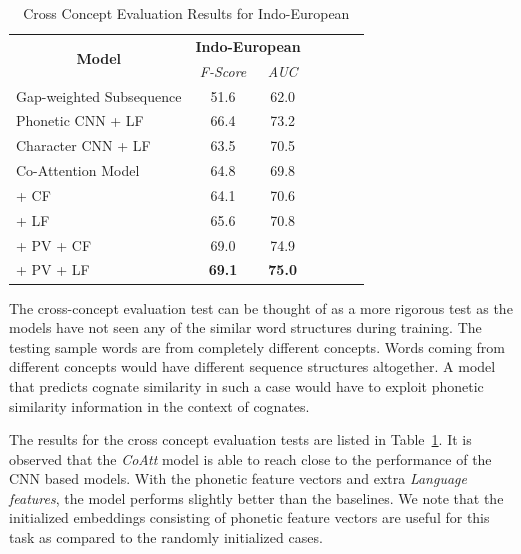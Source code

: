 \documentclass[11pt,letterpaper]{article}
\begin{document}
\begin{table}[htpb]
\centering
\begin{tabular}{lcccccc}
\multicolumn{1}{c}{\multirow{2}{*}{\textbf{Model}}} & \multicolumn{2}{c}{\textbf{Indo-European}} \\ \cline{2-3} 
\multicolumn{1}{c}{}                                & \textit{F-Score}      & \textit{AUC}    \\ \hline
Gap-weighted Subsequence              & 51.6                  & 62.0            \\
Phonetic CNN + LF                     & 66.4                  & 73.2            \\
Character CNN + LF                    & 63.5                  & 70.5            \\ \hline
Co-Attention Model                    & 64.8                  & 69.8            \\
\quad + CF                            & 64.1                  & 70.6            \\
\quad + LF                            & 65.6                  & 70.8            \\
\quad + PV + CF                       & 69.0                  & 74.9            \\
\quad + PV + LF                       & \textbf{69.1}                  & \textbf{75.0}
\end{tabular}
\label{CC_res}
\caption{Cross Concept Evaluation Results for Indo-European }
\end{table}

The cross-concept evaluation test can be thought of as a more rigorous test as the models have not seen any of the similar word structures during training. The testing sample words are from completely different concepts. Words coming from different concepts would have different sequence structures altogether. A model that predicts cognate similarity in such a case would have to exploit phonetic similarity information in the context of cognates. 

The results for the cross concept evaluation tests are listed in Table~\ref{CC_res}. It is observed that the \textit{CoAtt} model is able to reach close to the performance of the CNN based models. With the phonetic feature vectors and extra \textit{Language features}, the model performs slightly better than the baselines. We note that the initialized embeddings consisting of phonetic feature vectors are useful for this task as compared to the randomly initialized cases. 
\end{document}
